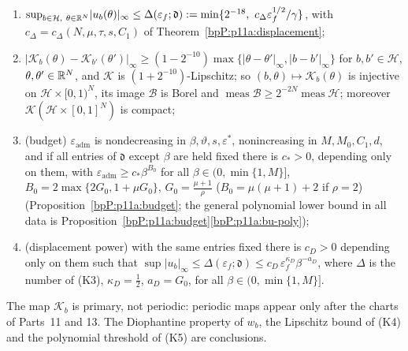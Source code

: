 \begin{theorem}
\begin{enumerate}[label=(K\arabic*)]
\item $\sup_{b\in\mathcal H,\ \theta\in\R^N}\lvert u_b(\theta)\rvert_\infty\le\Delta(\varepsilon_f;\mathfrak d):=\min\{2^{-18},\ c_\Delta\varepsilon_f^{1/2}/\gamma\}$, with $c_\Delta=c_\Delta(N,\mu,\tau,s,C_1)$ of Theorem~\ref{bpP:p11a:displacement};
\item $\lvert\mathcal K_b(\theta)-\mathcal K_{b'}(\theta')\rvert_\infty\ge(1-2^{-10})\max\{\lvert\theta-\theta'\rvert_\infty,\lvert b-b'\rvert_\infty\}$ for $b,b'\in\mathcal H$, $\theta,\theta'\in\mathbb{R}^N$, and $\mathcal K$ is $(1+2^{-10})$-Lipschitz; so $(b,\theta)\mapsto\mathcal K_b(\theta)$ is injective on $\mathcal H\times[0,1)^N$, its image $\mathcal B$ is Borel and $\operatorname{meas}\mathcal B\ge2^{-2N}\operatorname{meas}\mathcal H$; moreover $\mathcal K(\mathcal H\times[0,1]^N)$ is compact;
\item (budget) $\varepsilon_{\mathrm{adm}}$ is nondecreasing in $\beta,\vartheta,s,\varepsilon^*$, nonincreasing in $M,M_0,C_1,d$, and if all entries of $\mathfrak d$ except $\beta$ are held fixed there is $c_*>0$, depending only on them, with $\varepsilon_{\mathrm{adm}}\ge c_*\beta^{B_0}$ for all $\beta\in(0,\min\{1,M\}]$, $B_0=2\max\{2G_0,1+\mu G_0\}$, $G_0=\frac{\mu+1}\rho$ ($B_0=\mu(\mu+1)+2$ if $\rho=2$) (Proposition~\ref{bpP:p11a:budget}; the general polynomial lower bound in all data is Proposition~\ref{bpP:p11a:budget}\ref{bpP:p11a:bu-poly});
\item (displacement power) with the same entries fixed there is $c_D>0$ depending only on them such that $\sup\lvert u_b\rvert_\infty\le\Delta(\varepsilon_f;\mathfrak d)\le c_D\,\varepsilon_f^{\kappa_D}\beta^{-a_D}$, where $\Delta$ is the number of (K3), $\kappa_D=\frac12$, $a_D=G_0$, for all $\beta\in(0,\min\{1,M\}]$.
\end{enumerate}
The map $\mathcal K_b$ is primary, not periodic: periodic maps appear only after the charts of Parts~11 and 13. The Diophantine property of $w_b$, the Lipschitz bound of (K4) and the polynomial threshold of (K5) are conclusions.
\end{theorem}
